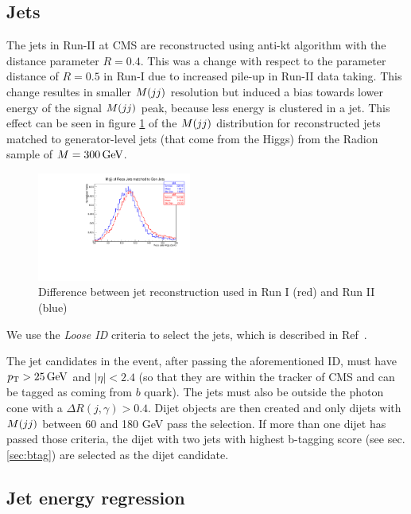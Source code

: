 \subsection{Jets}
\label{sec:jets}

The jets in Run-II at CMS are reconstructed using anti-kt algorithm
with the distance parameter $R=0.4$. This was a change with respect to
the parameter distance of $R=0.5$ in Run-I due to increased pile-up in
Run-II data taking. This change resultes in smaller $M(jj)$ resolution
but induced a bias towards lower energy of the signal $M(jj)$ peak,
because less energy is clustered in a jet. This effect can be seen in
figure \ref{fig:jet-reco} of the $M(jj)$ distribution for reconstructed
jets matched to generator-level jets (that come from the Higgs) from
the Radion sample of $M=300\,\text{Ge\hspace{-.08em}V}$.

\begin{figure}[h]
  \centering
  \includegraphics[width=0.45\textwidth]{figures/sec-jets/jet_rec.pdf}\hfil
  \caption{Difference between jet reconstruction used in Run I (red) and Run II (blue)}
  \label{fig:jet-reco}
\end{figure}

We use the \textit{Loose ID} criteria to select the jets, which is described in
Ref~\cite{jetID-twiki}.

The jet candidates in the event, after passing the aforementioned ID,
must have $p_{\mathrm{T}} > 25 \,\text{Ge\hspace{-.08em}V}$ and $|\eta| < 2.4$ (so that they are within
the tracker of CMS and can be tagged as coming from $b$ quark). The
jets must also be outside the photon cone with a $\Delta R(j,\gamma) >
0.4$. Dijet objects are then created and only dijets with $M(jj)$ between 60 and 180 GeV 
pass the selection. If more than one dijet has passed those criteria, the dijet with two jets
with highest b-tagging score (see sec. \ref{sec:btag}) are selected as
the dijet candidate.


\subsection{Jet energy regression}
\label{sec:b-reg}

